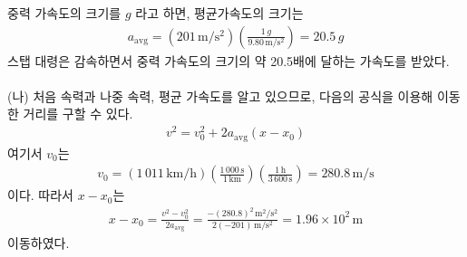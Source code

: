 \documentclass[APS,floatfix,nofootinbib,superscriptaddress,fleqn,preprint]{revtex4}
\begin{document}
\noindent  중력 가속도의 크기를 $g$ 라고 하면, 평균가속도의 크기는 
  \begin{align}
   a_{\mathrm{avg}} =  \left(\mathrm{201\,m/s^2}\right)
    \left(\frac{1\,g}{9.80\,\mathrm{m/s^2}}\right)
    = 20.5 \,g
  \end{align} 
  스탭 대령은 감속하면서 중력 가속도의 크기의 약 20.5배에 달하는 가속도를 받았다.
  \\
  \\
\noindent (나) 처음 속력과 나중 속력, 평균 가속도를 알고 있으므로,
    다음의 공식을 이용해 이동한 거리를 구할 수 있다. 
  \begin{align}
    v^2=v_0^2+2a_{\mathrm{avg}}(x-x_0)
  \end{align}
  여기서 $v_0$는
  \begin{align*}
    v_0 = (1\,011\,\mathrm{km/h}) \left(
    \frac{1\,000\,\mathrm{s}}{1\,\mathrm{km}}\right) 
    \left(\frac{1\,\mathrm{h}}{3\,600\,\mathrm{s}}\right)
    =280.8\,\mathrm{m/s}
  \end{align*}
  이다. 따라서 $x-x_0$는 
  \begin{align*}
x-x_0 =   \frac{v^2-v_0^2}{2a_{\mathrm{avg}}} =
    \frac{-(280.8)^2\,\mathrm{m^2/s^2}}{2(-201)\,\mathrm{m/s^2}}
   = 1.96\times 10^2\,\mathrm{m} 
 \end{align*}
이동하였다. 
\vspace{0.5cm}
\end{document}
